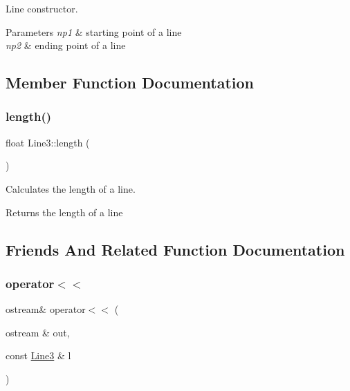 Line constructor. 


\begin{DoxyParams}{Parameters}
{\em np1} & starting point of a line \\
\hline
{\em np2} & ending point of a line \\
\hline
\end{DoxyParams}


\subsection{Member Function Documentation}
\mbox{\label{class_line3_a8b8113b527728d0d8ba9b4cdcd09da32}} 
\subsubsection{\texorpdfstring{length()}{length()}}
{\footnotesize\ttfamily float Line3\+::length (\begin{DoxyParamCaption}{ }\end{DoxyParamCaption})}



Calculates the length of a line. 

\begin{DoxyReturn}{Returns}
the length of a line 
\end{DoxyReturn}


\subsection{Friends And Related Function Documentation}
\mbox{\label{class_line3_a53d0a02d7be615c434c58c0779c3cc42}} 
\subsubsection{\texorpdfstring{operator$<$$<$}{operator<<}}
{\footnotesize\ttfamily ostream\& operator$<$$<$ (\begin{DoxyParamCaption}\item[{ostream \&}]{out,  }\item[{const \mbox{\hyperlink{class_line3}{Line3}} \&}]{l }\end{DoxyParamCaption})\hspace{0.3cm}{\ttfamily [friend]}}



